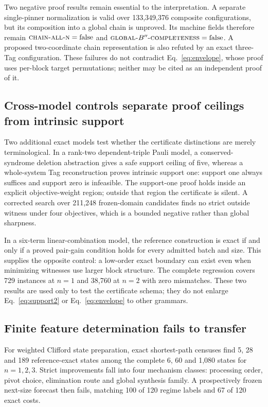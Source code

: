 Two negative proof results remain essential to the interpretation.  A separate single-pinner normalization is valid over 133,349,376 composite configurations, but its composition into a global chain is unproved.  Its machine fields therefore remain $\textsc{chain-all-n}=\mathrm{false}$ and $\textsc{global-}B''\textsc{-completeness}=\mathrm{false}$.  A proposed two-coordinate chain representation is also refuted by an exact three-Tag configuration.  These failures do not contradict Eq.~\eqref{eq:envelope}, whose proof uses per-block target permutations; neither may be cited as an independent proof of it.

\subsection{Cross-model controls separate proof ceilings from intrinsic support}

Two additional exact models test whether the certificate distinctions are merely terminological.  In a rank-two dependent-triple Pauli model, a conserved-syndrome deletion abstraction gives a safe support ceiling of five, whereas a whole-system Tag reconstruction proves intrinsic support one: support one always suffices and support zero is infeasible.  The support-one proof holds inside an explicit objective-weight region; outside that region the certificate is silent.  A corrected search over 211,248 frozen-domain candidates finds no strict outside witness under four objectives, which is a bounded negative rather than global sharpness.

In a six-term linear-combination model, the reference construction is exact if and only if a proved pair-gain condition holds for every admitted batch and size.  This supplies the opposite control: a low-order exact boundary can exist even when minimizing witnesses use larger block structure.  The complete regression covers 729 instances at $n=1$ and 38,760 at $n=2$ with zero mismatches.  These two results are used only to test the certificate schema; they do not enlarge Eq.~\eqref{eq:support2} or Eq.~\eqref{eq:envelope} to other grammars.

\subsection{Finite feature determination fails to transfer}

For weighted Clifford state preparation, exact shortest-path censuses find 5, 28 and 189 reference-exact states among the complete 6, 60 and 1,080 states for $n=1,2,3$.  Strict improvements fall into four mechanism classes: processing order, pivot choice, elimination route and global synthesis family.  A prospectively frozen next-size forecast then fails, matching 100 of 120 regime labels and 67 of 120 exact costs.

